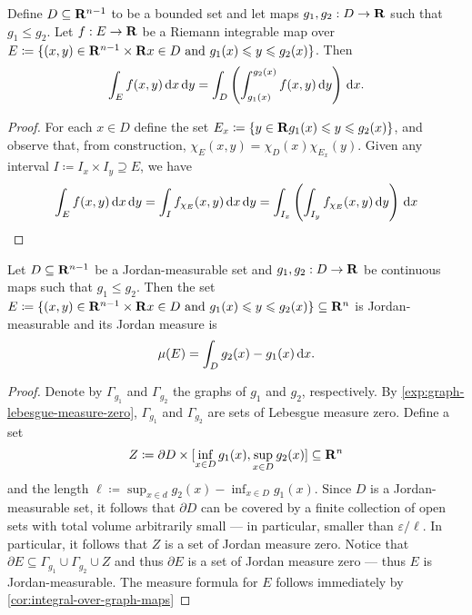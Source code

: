 \begin{corollary}
\label{cor:integral-over-graph-maps}
Define \(D \subseteq \mathbf{R}^{n-1}\) to be a bounded set and let maps \(g_{1}, g_{2}:
D \to \mathbf{R}\) such that \(g_1 \leq g_2\). Let \(f: E \to \mathbf{R}\) be a Riemann
integrable map over \(E \coloneq \{(x, y) \in \mathbf{R}^{n - 1} \times \mathbf{R} \relax x \in D
\text{ and } g_1(x) \leqslant y \leqslant g_2(x)\}\). Then
\[
  \int_E f(x, y)\, \mathrm{d} x\, \mathrm{d} y
  = \int_D \left( \int_{g_1(x)}^{g_2(x)} f(x, y)\, \mathrm{d} y \right)\, \mathrm{d} x.
\]
\end{corollary}

\begin{proof}
For each \(x \in D\) define the set \(E_x \coloneq \{y \in \mathbf{R} \relax g_{1}(x) \leqslant y
\leqslant g_2(x)\}\), and observe that, from construction, \(\chi_E(x, y) = \chi_D(x)
\chi_{E_x}(y)\). Given any interval \(I \coloneq I_x \times I_y \supseteq E\),
we have
\begin{align*}
  \int_E f(x, y)\, \mathrm{d} x\, \mathrm{d} y
  = \int_I f_{\chi_E}(x, y)\, \mathrm{d} x\, \mathrm{d} y
  = \int_{I_x} \left( \int_{I_y} f_{\chi_E}(x, y)\, \mathrm{d} y  \right)\, \mathrm{d} x
\end{align*}
\end{proof}

\begin{corollary}
\label{cor:measure-set-between-graphs-of-continuous-maps}
Let \(D \subseteq \mathbf{R}^{n-1}\) be a Jordan-measurable set and \(g_1, g_2: D \to
\mathbf{R}\) be continuous maps such that \(g_1 \leq g_2\). Then the set \(E \coloneq
\{(x, y) \in \mathbf{R}^{n-1} \times \mathbf{R} \relax x \in D \text{ and } g_1(x) \leqslant y \leqslant
g_2(x)\} \subseteq \mathbf{R}^n\) is Jordan-measurable and its Jordan measure is
\[
  \mu(E) = \int_D g_2(x) - g_1(x)\, \mathrm{d} x.
\]
\end{corollary}

\begin{proof}
Denote by \(\Gamma_{g_1}\) and \(\Gamma_{g_2}\) the graphs of \(g_1\) and
\(g_2\), respectively. By \cref{exp:graph-lebesgue-measure-zero},
\(\Gamma_{g_1}\) and \(\Gamma_{g_2}\) are sets of Lebesgue measure
zero. Define a set
\[
Z \coloneq \partial D \times
[\inf_{x \in D} g_1(x), \sup_{x \in D} g_2(x)] \subseteq \mathbf{R}^n
\] and the length \(\ell \coloneq \sup_{x
\in d} g_2(x) - \inf_{x \in D} g_1(x)\). Since \(D\) is a Jordan-measurable set,
it follows that \(\partial D\) can be covered by a finite collection of open
sets with total volume arbitrarily small --- in particular, smaller than
\(\varepsilon / \ell\). In particular, it follows that \(Z\) is a set of Jordan
measure zero. Notice that \(\partial E \subseteq \Gamma_{g_1} \cup
\Gamma_{g_2} \cup Z\) and thus \(\partial E\) is a set of Jordan measure zero
--- thus \(E\) is Jordan-measurable. The measure formula for \(E\) follows
immediately by \cref{cor:integral-over-graph-maps}
\end{proof}

